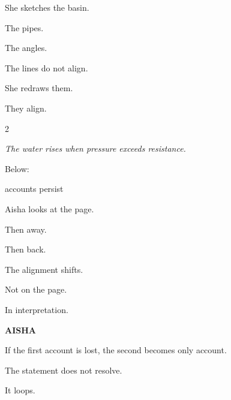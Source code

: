 
\medskip

She sketches the basin.

The pipes.

The angles.

\medskip

The lines do not align.

\medskip

She redraws them.

\medskip

They align.

\medskip

\begin{multicols}{2}

\textit{The water rises when pressure exceeds resistance.}

\columnbreak


\end{multicols}

\medskip

Below:

\medskip

\begin{center}
 accounts persist
\end{center}

\medskip

Aisha looks at the page.

Then away.

Then back.

\medskip

The alignment shifts.

Not on the page.

In interpretation.

\medskip

\textbf{AISHA}

If the first account is lost, the second becomes  only account.

\medskip


\medskip

The statement does not resolve.

It loops.

